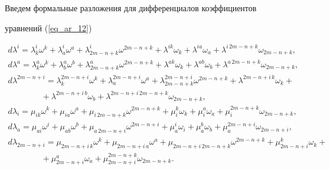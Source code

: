 Введем формальные разложения для дифференциалов коэффициентов


уравнений (\ref{eq_ar_12})


\begin{equation}


\label{eq_ar_13}


\begin{array}{l}


d\lambda^i=\lambda^i_k \omega^k+\lambda^i_a \omega^a + \lambda^i_{2m-n+k}


\omega^{2m-n+k}+ \lambda^{ik} \omega_k + \lambda^{ia} \omega_a +


\lambda^{i\, 2m-n+k} \omega_{2m-n+k},\\


d\lambda^a=\lambda^a_k \omega^k+\lambda^a_b \omega^b +\lambda^{a}_{2m-n+k}


\omega^{2m-n+k}+ \lambda^{ak} \omega_k + \lambda^{ab} \omega_b +


\lambda^{a\, 2m-n+k} \omega_{2m-n+k},\\


d\lambda^{2m-n+i}=\lambda^{2m-n+i}_k \omega^k+\lambda^{2m-n+i}_a \omega^a


+\lambda^{2m-n+i}_{2m-n+k}\omega^{2m-n+k}+ \lambda^{2m-n+i\, k} \omega_k+\\


\qquad\qquad + \lambda^{2m-n+i\, b} \omega_b + \lambda^{2m-n+i\, 2m-n+k}


\omega_{2m-n+k},\\


d\lambda_i=\mu_{ik} \omega^k+\mu_{ia} \omega^a + \mu_{i\, {2m-n+k}}


\omega^{2m-n+k}+ \mu_i^{k} \omega_k + \mu_i^{a} \omega_a + \mu^{2m-n+k}_i


\omega_{2m-n+k},\\


d\lambda_a=\mu_{ai} \omega^i+\mu_{ab} \omega^b + \mu_{a\, {2m-n+i}}


\omega^{2m-n+i}+ \mu^i_{a} \omega_i + \mu_a^b \omega_b + \mu^{2m-n+i}_a


\omega_{2m-n+i},\\


d\lambda_{2m-n+i}=\mu_{{2m-n+i}\, k} \omega^k+\mu_{{2m-n+i}\, a} \omega^a


+ \mu_{{2m-n+i}\, 2m-n+k} \omega^{2m-n+k}+ \mu^k_{2m-n+i} \omega_k +\\


\qquad\qquad +\mu^a_{2m-n+i} \omega_a + \mu^{2m-n+k}_{2m-n+i} \omega_{2m-n+k}.


\end{array}


\end{equation}


